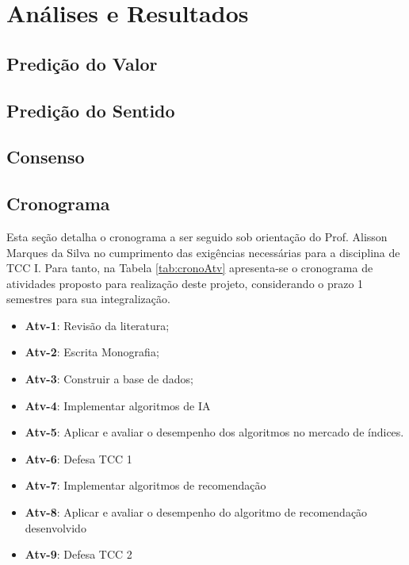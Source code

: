 \chapter{Análises e Resultados}

\section{Predição do Valor}
\section{Predição do Sentido}
\section{Consenso}


\section{Cronograma}
Esta seção detalha o cronograma a ser seguido sob orientação do Prof. Alisson Marques da Silva no cumprimento das exigências necessárias para a disciplina de TCC I. Para tanto, na Tabela \ref{tab:cronoAtv} apresenta-se o cronograma de atividades proposto para realização deste projeto, considerando o prazo 1 semestres para sua integralização.

\begin{itemize}
    \item \textbf{Atv-1}: Revisão da literatura;
    \item \textbf{Atv-2}: Escrita Monografia;
    \item \textbf{Atv-3}: Construir a base de dados;
    \item \textbf{Atv-4}: Implementar algoritmos de IA 
    \item \textbf{Atv-5}: Aplicar e avaliar o desempenho dos algoritmos no mercado de índices.
    \item \textbf{Atv-6}: Defesa TCC 1
    \item \textbf{Atv-7}: Implementar algoritmos de recomendação
    \item \textbf{Atv-8}: Aplicar e avaliar o desempenho do algoritmo de recomendação desenvolvido
    \item \textbf{Atv-9}: Defesa TCC 2
\end{itemize}

